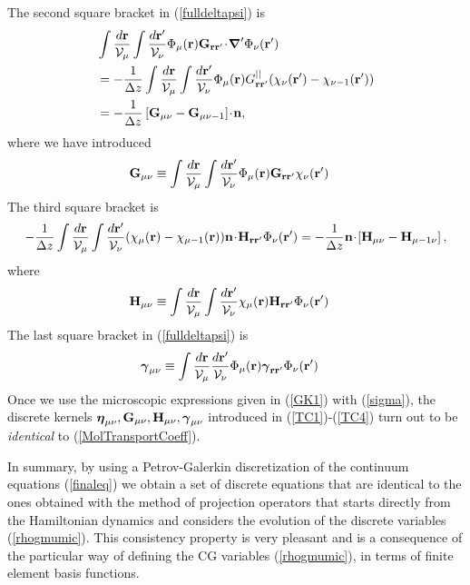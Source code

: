 \documentclass[b5paper,openright,10pt]{book}
\newcommand{\esc}{\!\cdot\!}
\begin{document}
The second square bracket in (\ref{fulldeltapsi}) is
\begin{align}
&\int \frac{d{\bf r}}{{\cal V}_\mu}\int \frac{d{\bf r}'}{{\cal V}_\nu}
\Phi_\mu({\bf r}){\bf G}_{{\bf r}{\bf r}'}\esc{\boldsymbol{\nabla}^\prime}\Phi_\nu({\bf r}')
\nonumber\\
&=-\frac{1}{\Delta z}\int \frac{d{\bf r}}{{\cal V}_\mu}\int \frac{d{\bf r}'}{{\cal V}_\nu}
\Phi_\mu({\bf r})G^{||}_{{\bf r}{\bf r}'}
(\chi_\nu({\bf r}')-\chi_{\nu-1}({\bf r}'))
\nonumber\\
&=-\frac{1}{\Delta z}\left[{\bf G}_{\mu\nu}-{\bf G}_{\mu\nu-1}\right]\esc{\bf n},
\label{TC4b}
\end{align}
where we have introduced
\begin{align}
{\bf G}_{\mu\nu}&\equiv \int \frac{d{\bf r}}{{\cal V}_\mu}\int \frac{d{\bf r}'}{{\cal V}_\nu}
\Phi_\mu({\bf r}){\bf G}_{{\bf r}{\bf r}'}
\chi_\nu({\bf r}')
\end{align}
The third square bracket is 
\begin{align}
-\frac{1}{\Delta z}\int \frac{d{\bf r}}{{\cal V}_\mu}\int \frac{d{\bf r}'}{{\cal V}_\nu}
(\chi_\mu({\bf r})-\chi_{\mu-1}({\bf r})){\bf n}\esc
{\bf H}_{{\bf r}{\bf r}'}\Phi_\nu({\bf r}')
=-\frac{1}{\Delta z}{\bf n}\esc\left[{\bf H}_{\mu\nu}-{\bf H}_{\mu-1\nu}\right],
\end{align}
where
\begin{align}
{\bf H}_{\mu\nu}&\equiv \int \frac{d{\bf r}}{{\cal V}_\mu}\int \frac{d{\bf r}'}{{\cal V}_\nu}
\chi_\mu({\bf r}){\bf H}_{{\bf r}{\bf r}'}
\Phi_\nu({\bf r}')
\label{TC4}
\end{align}
The last square bracket in (\ref{fulldeltapsi}) is
\begin{align}
\boldsymbol{\gamma}_{\mu\nu}&\equiv \int \frac{d{\bf r}}{{\cal V}_\mu} \frac{d{\bf r}'}{{\cal V}_\nu}
\Phi_\mu({\bf r})\boldsymbol{\gamma}_{{\bf r}{\bf r}'}\Phi_\nu({\bf r}')
\label{apgammmunu}
\end{align}
Once  we use  the  microscopic expressions  given  in (\ref{GK1})  with
(\ref{sigma}), the discrete  kernels $\boldsymbol{\eta}_{\mu\nu}, {\bf
  G}_{\mu\nu},      {\bf     H}_{\mu\nu},\boldsymbol{\gamma}_{\mu\nu}$
introduced    in    (\ref{TC1})-(\ref{TC4})    turn    out    to    be
\textit{identical} to (\ref{MolTransportCoeff}). 

In summary, by using a Petrov-Galerkin discretization of the continuum
equations (\ref{finaleq}) we  obtain a set of  discrete equations that
are  identical to  the ones  obtained  with the  method of  projection
operators  that  starts directly  from  the  Hamiltonian dynamics  and
considers the  evolution of the discrete  variables (\ref{rhogmumic}).
This consistency property is very pleasant and is a consequence of the
particular  way of  defining  the CG  variables (\ref{rhogmumic}),  in
terms of finite element basis functions.
\end{document}
